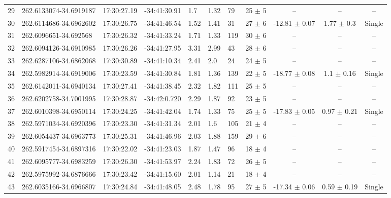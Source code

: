 \begin{table}[htbp!]
\begin{tabular}{llllllllccc}
29  &  262.6133074-34.6919187  &  17:30:27.19  &  -34:41:30.91  &  1.7  &  1.32  &  79  &  25 $\pm$ 5  &  --  &  --  &  -- \\
30  &  262.6114686-34.6962602  &  17:30:26.75  &  -34:41:46.54  &  1.52  &  1.41  &  31  &  27 $\pm$ 6  &  -12.81 $\pm$ 0.07  &  1.77 $\pm$ 0.3  &  Single \\
31  &  262.6096651-34.692568  &  17:30:26.32  &  -34:41:33.24  &  1.71  &  1.33  &  119  &  30 $\pm$ 6  &  --  &  --  &  -- \\
32  &  262.6094126-34.6910985  &  17:30:26.26  &  -34:41:27.95  &  3.31  &  2.99  &  43  &  28 $\pm$ 6  &  --  &  --  &  -- \\
33  &  262.6287106-34.6862068  &  17:30:30.89  &  -34:41:10.34  &  2.41  &  2.0  &  24  &  24 $\pm$ 5  &  --  &  --  &  -- \\
34  &  262.5982914-34.6919006  &  17:30:23.59  &  -34:41:30.84  &  1.81  &  1.36  &  139  &  22 $\pm$ 5  &  -18.77 $\pm$ 0.08  &  1.1 $\pm$ 0.16  &  Single \\
35  &  262.6142011-34.6940134  &  17:30:27.41  &  -34:41:38.45  &  2.32  &  1.82  &  111  &  25 $\pm$ 5  &  --  &  --  &  -- \\
36  &  262.6202758-34.7001995  &  17:30:28.87  &  -34:42:0.720  &  2.29  &  1.87  &  92  &  23 $\pm$ 5  &  --  &  --  &  -- \\
37  &  262.6010398-34.6950114  &  17:30:24.25  &  -34:41:42.04  &  1.74  &  1.33  &  75  &  25 $\pm$ 5  &  -17.83 $\pm$ 0.05  &  0.97 $\pm$ 0.21  &  Single \\
38  &  262.5971034-34.6920396  &  17:30:23.30  &  -34:41:31.34  &  2.01  &  1.6  &  105  &  21 $\pm$ 4  &  --  &  --  &  -- \\
39  &  262.6054437-34.6963773  &  17:30:25.31  &  -34:41:46.96  &  2.03  &  1.88  &  159  &  29 $\pm$ 6  &  --  &  --  &  -- \\
40  &  262.5917454-34.6897316  &  17:30:22.02  &  -34:41:23.03  &  1.87  &  1.47  &  96  &  18 $\pm$ 4  &  --  &  --  &  -- \\
41  &  262.6095777-34.6983259  &  17:30:26.30  &  -34:41:53.97  &  2.24  &  1.83  &  72  &  26 $\pm$ 5  &  --  &  --  &  -- \\
42  &  262.5975992-34.6876666  &  17:30:23.42  &  -34:41:15.60  &  2.01  &  1.14  &  21  &  18 $\pm$ 4  &  --  &  --  &  -- \\
43  &  262.6035166-34.6966807  &  17:30:24.84  &  -34:41:48.05  &  2.48  &  1.78  &  95  &  27 $\pm$ 5  &  -17.34 $\pm$ 0.06  &  0.59 $\pm$ 0.19  &  Single \\

\end{tabular}
\end{table}
